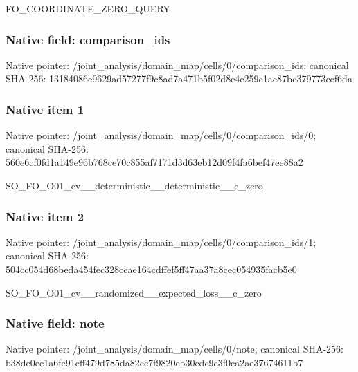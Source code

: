 \documentclass[10pt,a4paper]{article}
\begin{document}
\begingroup\raggedright\sloppy FO\_\allowbreak{}COORDINATE\_\allowbreak{}ZERO\_\allowbreak{}QUERY\par\endgroup

\subsubsection{Native field: comparison\_\allowbreak{}ids}
Native pointer: /joint\_\allowbreak{}analysis/domain\_\allowbreak{}map/cells/0/comparison\_\allowbreak{}ids; canonical SHA-256: 13184086e9629ad57277f9c8ad7a471b5f02d8e4c259c1ac87bc379773ccf6da

\subsubsection{Native item 1}
Native pointer: /joint\_\allowbreak{}analysis/domain\_\allowbreak{}map/cells/0/comparison\_\allowbreak{}ids/0; canonical SHA-256: 560e6cf0fd1a149e96b768ce70c855af7171d3d63eb12d09f4fa6bef47ee88a2

\begingroup\raggedright\sloppy SO\_\allowbreak{}FO\_\allowbreak{}O01\_\allowbreak{}cv\_\allowbreak{}\_\allowbreak{}deterministic\_\allowbreak{}\_\allowbreak{}deterministic\_\allowbreak{}\_\allowbreak{}c\_\allowbreak{}zero\par\endgroup

\subsubsection{Native item 2}
Native pointer: /joint\_\allowbreak{}analysis/domain\_\allowbreak{}map/cells/0/comparison\_\allowbreak{}ids/1; canonical SHA-256: 504cc054d68beda454fec328ceae164cdffef5ff47aa37a8cec054935facb5e0

\begingroup\raggedright\sloppy SO\_\allowbreak{}FO\_\allowbreak{}O01\_\allowbreak{}cv\_\allowbreak{}\_\allowbreak{}randomized\_\allowbreak{}\_\allowbreak{}expected\_\allowbreak{}loss\_\allowbreak{}\_\allowbreak{}c\_\allowbreak{}zero\par\endgroup

\subsubsection{Native field: note}
Native pointer: /joint\_\allowbreak{}analysis/domain\_\allowbreak{}map/cells/0/note; canonical SHA-256: b38de0ec1a6fe91cff479d785da82ec7f9820eb30edc9e3f0ca2ae37674611b7
\end{document}
